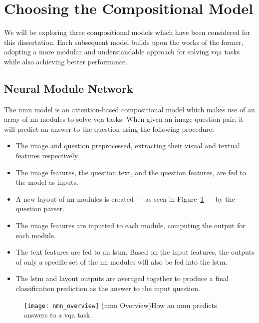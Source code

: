 \graphicspath{{content/chapters/literature_review/choosing_the_compositional_model/figures}}

\section{Choosing the Compositional Model}
\label{sec:choosing_the_compositional_model}

We will be exploring three compositional models which have been considered for this dissertation.
Each subsequent model builds upon the works of the former, adopting a more modular and understandable approach for solving \gls{vqa} tasks while also achieving better performance.

\subsection{Neural Module Network}
\label{subsec:neural_module_network}

The \gls{nmn} model\cite{andreas_neural_2016} is an attention-based compositional model which makes use of an array of \gls{nn} modules to solve \gls{vqa} tasks.
When given an image-question pair, it will predict an answer to the question using the following procedure:

\begin{itemize}\label{list:nmn_procedure}
    \item The image and question preprocessed, extracting their visual and textual features respectively.
    \item The image features, the question text, and the question features, are fed to the model as inputs.
    \item A new layout of \gls{nn} modules is created --- as seen in Figure~\ref{fig:nmn_overview} --- by the question parser.
    \item The image features are inputted to each module, computing the output for each module.
    \item The text features are fed to an \acrshort{lstm}. Based on the input features, the outputs of only a specific set of the \gls{nn} modules will also be fed into the \acrshort{lstm}.
    \item The \gls{lstm} and layout outputs are averaged together to produce a final classification prediction as the answer to the input question.
\end{itemize}

\begin{figure}[htbp]
    \centering
    \texttt{[image: nmn\_overview]}
    \captionsource(\acrshort{nmn} Overview){How an \acrshort{nmn} predicts answers to a \acrshort{vqa} task. \label{fig:nmn_overview}}{\citeauthor{andreas_deep_2016}\cite{andreas_deep_2016}}
\end{figure}

